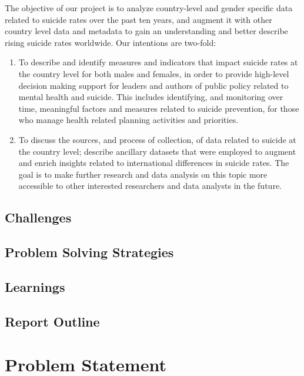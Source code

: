 \documentclass[]{article}
\providecommand{\tightlist}{%
  \setlength{\itemsep}{0pt}\setlength{\parskip}{0pt}}
\begin{document}
The objective of our project is to analyze country-level and gender
specific data related to suicide rates over the past ten years, and
augment it with other country level data and metadata to gain an
understanding and better describe rising suicide rates worldwide. Our
intentions are two-fold:

\begin{enumerate}
\def\labelenumi{\arabic{enumi}.}
\tightlist
\item
  To describe and identify measures and indicators that impact suicide
  rates at the country level for both males and females, in order to
  provide high-level decision making support for leaders and authors of
  public policy related to mental health and suicide. This includes
  identifying, and monitoring over time, meaningful factors and measures
  related to suicide prevention, for those who manage health related
  planning activities and priorities.\\
\item
  To discuss the sources, and process of collection, of data related to
  suicide at the country level; describe ancillary datasets that were
  employed to augment and enrich insights related to international
  differences in suicide rates. The goal is to make further research and
  data analysis on this topic more accessible to other interested
  researchers and data analysts in the future.
\end{enumerate}

\subsection{Challenges}\label{challenges}

\subsection{Problem Solving
Strategies}\label{problem-solving-strategies}

\subsection{Learnings}\label{learnings}

\subsection{Report Outline}\label{report-outline}

\section{Problem Statement}\label{problem-statement}
\end{document}

